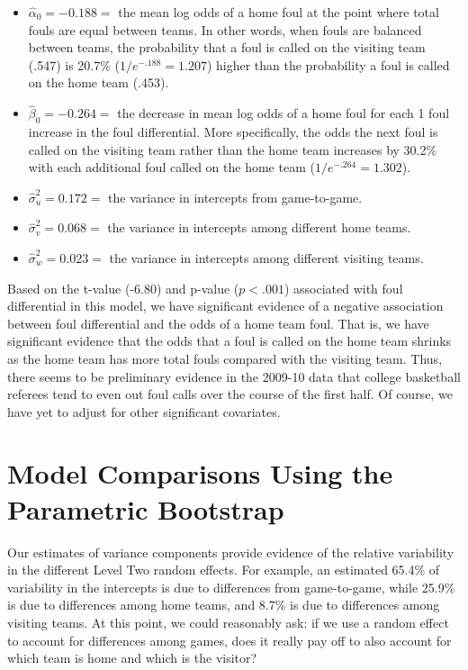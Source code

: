 \documentclass[
]{krantz}
\providecommand{\tightlist}{%
  \setlength{\itemsep}{0pt}\setlength{\parskip}{0pt}}
\begin{document}
\begin{itemize}
\tightlist
\item
  \(\hat{\alpha}_{0}=-0.188=\) the mean log odds of a home foul at the point where total fouls are equal between teams. In other words, when fouls are balanced between teams, the probability that a foul is called on the visiting team (.547) is 20.7\% (\(1/e^{-.188}=1.207\)) higher than the probability a foul is called on the home team (.453).
\item
  \(\hat{\beta}_{0}=-0.264=\) the decrease in mean log odds of a home foul for each 1 foul increase in the foul differential. More specifically, the odds the next foul is called on the visiting team rather than the home team increases by 30.2\% with each additional foul called on the home team (\(1/e^{-.264}=1.302\)).
\item
  \(\hat{\sigma}_{u}^{2}=0.172=\) the variance in intercepts from game-to-game.
\item
  \(\hat{\sigma}_{v}^{2}=0.068=\) the variance in intercepts among different home teams.
\item
  \(\hat{\sigma}_{w}^{2}=0.023=\) the variance in intercepts among different visiting teams.
\end{itemize}

Based on the t-value (-6.80) and p-value (\(p<.001\)) associated with foul differential in this model, we have significant evidence of a negative association between foul differential and the odds of a home team foul. That is, we have significant evidence that the odds that a foul is called on the home team shrinks as the home team has more total fouls compared with the visiting team. Thus, there seems to be preliminary evidence in the 2009-10 data that college basketball referees tend to even out foul calls over the course of the first half. Of course, we have yet to adjust for other significant covariates.

\hypertarget{glmm-paraboot}{%
\section{Model Comparisons Using the Parametric Bootstrap}\label{glmm-paraboot}}

Our estimates of variance components provide evidence of the relative variability in the different Level Two random effects. For example, an estimated 65.4\% of variability in the intercepts is due to differences from game-to-game, while 25.9\% is due to differences among home teams, and 8.7\% is due to differences among visiting teams. At this point, we could reasonably ask: if we use a random effect to account for differences among games, does it really pay off to also account for which team is home and which is the visitor?
\end{document}
